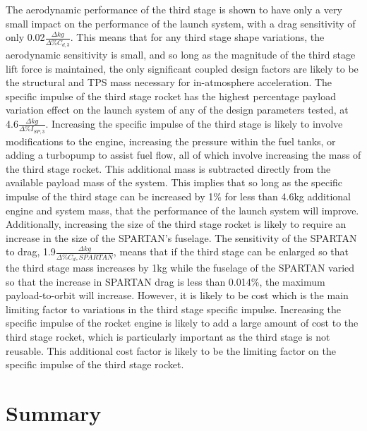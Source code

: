  The aerodynamic performance of the third stage is shown to have only a very small impact on the performance of the launch system, with a drag sensitivity of only 0.02$\frac{\Delta kg}{\Delta\%C_{d,3}}$. This means that for any third stage shape variations, the aerodynamic sensitivity is small, and so long as the magnitude of the third stage lift force is maintained, the only significant coupled design factors are likely to be the structural and TPS mass necessary for in-atmosphere acceleration.
 The specific impulse of the third stage rocket has the highest percentage payload variation effect on the launch system of any of the design parameters tested, at 4.6$\frac{\Delta kg}{\Delta\%I_{SP,3}}$. Increasing the specific impulse of the third stage is likely to involve modifications to the engine, increasing the pressure within the fuel tanks, or adding a turbopump to assist fuel flow, all of which involve increasing the mass of the third stage rocket. 
This additional mass is subtracted directly from the available payload mass of the system. This implies that so long as the specific impulse of the third stage can be increased by 1\% for less than 4.6kg additional engine and system mass, that the performance of the launch system will improve. 
 Additionally, increasing the size of the third stage rocket is likely to require an increase in the size of the SPARTAN's fuselage. The sensitivity of the SPARTAN to drag, 1.9$\frac{\Delta kg}{\Delta\%C_d,{SPARTAN}}$, means that if the third stage can be enlarged so that the third stage mass increases by 1kg while the fuselage of the SPARTAN varied so that the increase in SPARTAN drag is less than 0.014\%, the maximum payload-to-orbit will increase. 
However, it is likely to be cost which is the main limiting factor to variations in the third stage specific impulse. 
Increasing the specific impulse of the rocket engine is likely to add a large amount of cost to the third stage rocket, which is particularly important as the third stage is not reusable. This additional cost factor is likely to be the limiting factor on the specific impulse of the third stage rocket. 







\section{Summary}


